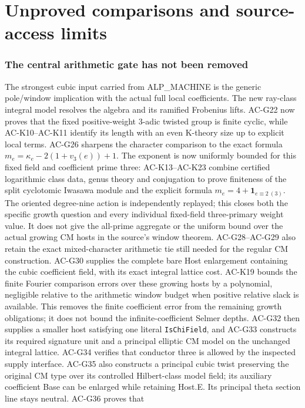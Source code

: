 \documentclass[11pt,a4paper]{article}
\theoremstyle{definition}
\theoremstyle{remark}
\begin{document}
\part{Unproved comparisons and source-access limits}
\section{The central arithmetic gate has not been removed}
The strongest cubic input carried from ALP\_MACHINE is the
generic pole/window implication with the actual full local
coefficients. The new ray-class integral model resolves
the algebra and its ramified Frobenius lifts. AC-G22 now
proves that the fixed positive-weight $3$-adic twisted
group is finite cyclic, while AC-K10--AC-K11 identify its
length with an even K-theory size up to explicit local
terms. AC-G26 sharpens the character comparison to the
exact formula $m_e=\kappa_e-2(1+v_3(e))+1$. The exponent
is now uniformly bounded for this fixed field and coefficient
prime three: AC-K13--AC-K23 combine certified logarithmic
class data, genus theory and conjugation to prove finiteness
of the split cyclotomic Iwasawa module and the explicit
formula $m_e=4+\mathbf1_{e\equiv2\ (3)}$.
The oriented degree-nine action is independently replayed;
this closes both the specific growth question and every
individual fixed-field three-primary weight value. It does not give the all-prime
aggregate or the uniform bound over the actual growing
CM hosts in the source's window theorem. AC-G28--AC-G29
also retain the exact mixed-character arithmetic tie still
needed for the regular CM construction. AC-G30 supplies
the complete bare Host enlargement containing the cubic
coefficient field, with its exact integral lattice cost.
AC-K19 bounds the finite Fourier comparison errors over
these growing hosts by a polynomial, negligible relative
to the arithmetic window budget when positive relative
slack is available. This removes the finite coefficient
error from the remaining growth obligations; it does not
bound the infinite-coefficient Selmer depths.
AC-G32 then supplies a smaller host satisfying one literal
\texttt{IsChiField}, and AC-G33 constructs its required
signature unit and a principal elliptic CM model on the
unchanged integral lattice. AC-G34 verifies that conductor three
is allowed by the inspected supply interface. AC-G35 also
constructs a principal cubic twist preserving the original CM type
over its controlled Hilbert-class model field; its auxiliary
coefficient Base can be enlarged while retaining Host.E.
Its principal theta section line stays neutral. AC-G36 proves that
\end{document}
